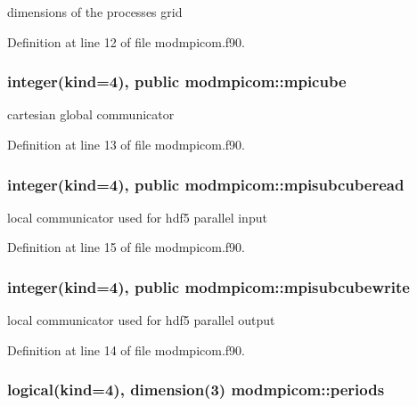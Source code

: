 dimensions of the processes grid 



Definition at line 12 of file modmpicom.\-f90.

\hypertarget{classmodmpicom_a98a18237a2ccfdfdfd230104e90e9b5d}{
\subsubsection[{mpicube}]{\setlength{\rightskip}{0pt plus 5cm}integer(kind=4), public modmpicom\-::mpicube}}\label{classmodmpicom_a98a18237a2ccfdfdfd230104e90e9b5d}


cartesian global communicator 



Definition at line 13 of file modmpicom.\-f90.

\hypertarget{classmodmpicom_a0e30077f764b1d64af266f38546eb11b}{
\subsubsection[{mpisubcuberead}]{\setlength{\rightskip}{0pt plus 5cm}integer(kind=4), public modmpicom\-::mpisubcuberead}}\label{classmodmpicom_a0e30077f764b1d64af266f38546eb11b}


local communicator used for hdf5 parallel input 



Definition at line 15 of file modmpicom.\-f90.

\hypertarget{classmodmpicom_aa4714e524c20e853ca0d8eee443a3eaa}{
\subsubsection[{mpisubcubewrite}]{\setlength{\rightskip}{0pt plus 5cm}integer(kind=4), public modmpicom\-::mpisubcubewrite}}\label{classmodmpicom_aa4714e524c20e853ca0d8eee443a3eaa}


local communicator used for hdf5 parallel output 



Definition at line 14 of file modmpicom.\-f90.

\hypertarget{classmodmpicom_a0347e6d8a15028132a57953e6ff823a2}{
\subsubsection[{periods}]{\setlength{\rightskip}{0pt plus 5cm}logical(kind=4), dimension(3) modmpicom\-::periods}}\label{classmodmpicom_a0347e6d8a15028132a57953e6ff823a2}


